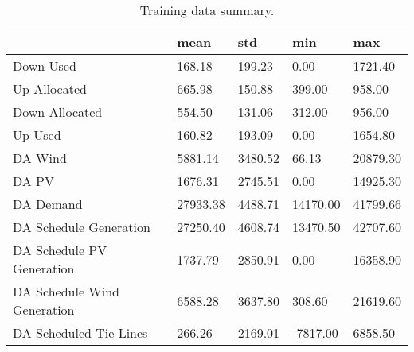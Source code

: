 \begin{table}[H] 
    \caption{Training data summary. \label{training_data_sum}}
    \begin{tabularx}{\textwidth}{CCCCC}
    \toprule
    & \textbf{mean}	& \textbf{std}	& \textbf{min} & \textbf{max}\\
    \midrule
    Down Used & 168.18 & 199.23 & 0.00 & 1721.40 \\
    Up Allocated & 665.98 & 150.88 & 399.00 & 958.00 \\
    Down Allocated & 554.50 & 131.06 & 312.00 & 956.00 \\
    Up Used & 160.82 & 193.09 & 0.00 & 1654.80 \\
    DA Wind & 5881.14 & 3480.52 & 66.13 & 20879.30 \\
    DA PV & 1676.31 & 2745.51 & 0.00 & 14925.30 \\
    DA Demand & 27933.38 & 4488.71 & 14170.00 & 41799.66 \\
    DA Schedule Generation & 27250.40 & 4608.74 & 13470.50 & 42707.60 \\
    DA Schedule PV Generation & 1737.79 & 2850.91 & 0.00 & 16358.90 \\
    DA Schedule Wind Generation & 6588.28 & 3637.80 & 308.60 & 21619.60 \\
    DA Scheduled Tie Lines & 266.26 & 2169.01 & -7817.00 & 6858.50 \\
    \bottomrule
    \end{tabularx}
\end{table}

